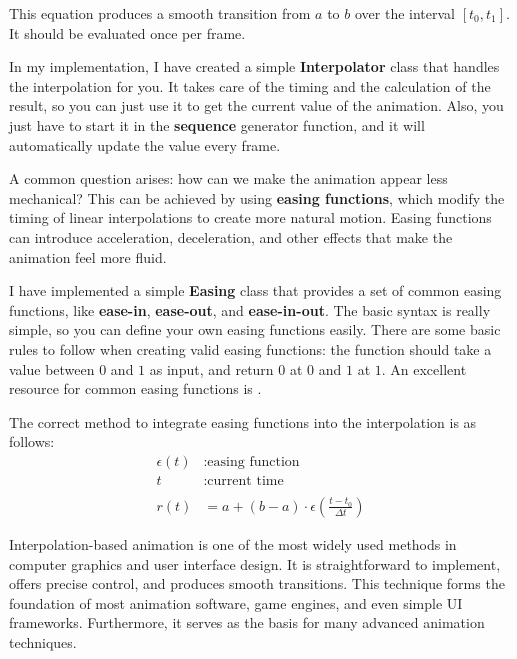 This equation produces a smooth transition from \(a\) to \(b\) over the interval \([t_0, t_1]\). It should be evaluated once per frame.

\begin{Note}
    In my implementation, I have created a simple \textbf{Interpolator} class that handles the interpolation for you. It takes care of the timing and the calculation of the result, so you can just use it to get the current value of the animation. Also, you just have to start it in the \textbf{sequence} generator function, and it will automatically update the value every frame.
\end{Note}

A common question arises: how can we make the animation appear less mechanical? This can be achieved by using \textbf{easing functions}, which modify the timing of linear interpolations to create more natural motion. Easing functions can introduce acceleration, deceleration, and other effects that make the animation feel more fluid.

\begin{Note}
    I have implemented a simple \textbf{Easing} class that provides a set of common easing functions, like \textbf{ease-in}, \textbf{ease-out}, and \textbf{ease-in-out}. The basic syntax is really simple, so you can define your own easing functions easily. There are some basic rules to follow when creating valid easing functions: the function should take a value between \(0\) and \(1\) as input, and return \(0\) at \(0\) and \(1\) at \(1\). An excellent resource for common easing functions is \cite{easings}.
\end{Note}

The correct method to integrate easing functions into the interpolation is as follows:
\begin{align*}
    \epsilon(t)&: \text{easing function} \\
    t &: \text{current time} \\
    \\
    r(t) &= a + (b - a) \cdot \epsilon\left(\frac{t - t_0}{\Delta t}\right)
\end{align*}


\pagebreak

Interpolation-based animation is one of the most widely used methods in computer graphics and user interface design. It is straightforward to implement, offers precise control, and produces smooth transitions. This technique forms the foundation of most animation software, game engines, and even simple UI frameworks. Furthermore, it serves as the basis for many advanced animation techniques.

